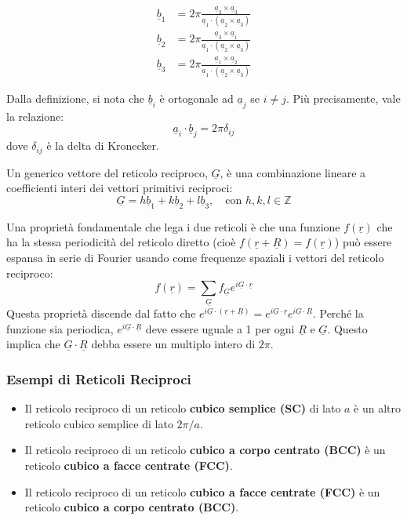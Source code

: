 \begin{align}
    \underline{b}_1 &= 2\pi \frac{\underline{a}_2 \times \underline{a}_3}{\underline{a}_1 \cdot (\underline{a}_2 \times \underline{a}_3)} \\
    \underline{b}_2 &= 2\pi \frac{\underline{a}_3 \times \underline{a}_1}{\underline{a}_1 \cdot (\underline{a}_2 \times \underline{a}_3)} \\
    \underline{b}_3 &= 2\pi \frac{\underline{a}_1 \times \underline{a}_2}{\underline{a}_1 \cdot (\underline{a}_2 \times \underline{a}_3)}
\end{align}

Dalla definizione, si nota che $\underline{b}_i$ è ortogonale ad $\underline{a}_j$ se $i \neq j$. Più precisamente, vale la relazione:
\begin{equation}
    \underline{a}_i \cdot \underline{b}_j = 2\pi \delta_{ij}
\end{equation}
dove $\delta_{ij}$ è la delta di Kronecker.

Un generico vettore del reticolo reciproco, $\underline{G}$, è una combinazione lineare a coefficienti interi dei vettori primitivi reciproci:
\begin{equation}
    \underline{G} = h\underline{b}_1 + k\underline{b}_2 + l\underline{b}_3, \quad \text{con } h, k, l \in \mathbb{Z}
\end{equation}

Una proprietà fondamentale che lega i due reticoli è che una funzione $f(\underline{r})$ che ha la stessa periodicità del reticolo diretto (cioè $f(\underline{r}+\underline{R}) = f(\underline{r})$) può essere espansa in serie di Fourier usando come frequenze spaziali i vettori del reticolo reciproco:
\begin{equation}
    f(\underline{r}) = \sum_{\underline{G}} f_{\underline{G}} e^{i\underline{G}\cdot\underline{r}}
\end{equation}
Questa proprietà discende dal fatto che $e^{i\underline{G}\cdot(\underline{r}+\underline{R})} = e^{i\underline{G}\cdot\underline{r}}e^{i\underline{G}\cdot\underline{R}}$. Perché la funzione sia periodica, $e^{i\underline{G}\cdot\underline{R}}$ deve essere uguale a 1 per ogni $\underline{R}$ e $\underline{G}$. Questo implica che $\underline{G}\cdot\underline{R}$ debba essere un multiplo intero di $2\pi$.

\subsubsection*{Esempi di Reticoli Reciproci}
\begin{itemize}
    \item Il reticolo reciproco di un reticolo \textbf{cubico semplice (SC)} di lato $a$ è un altro reticolo cubico semplice di lato $2\pi/a$.
    \item Il reticolo reciproco di un reticolo \textbf{cubico a corpo centrato (BCC)} è un reticolo \textbf{cubico a facce centrate (FCC)}.
    \item Il reticolo reciproco di un reticolo \textbf{cubico a facce centrate (FCC)} è un reticolo \textbf{cubico a corpo centrato (BCC)}.
\end{itemize}

